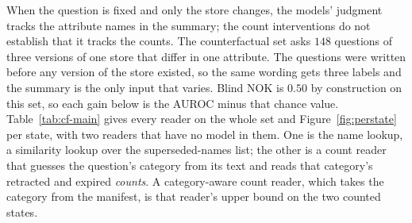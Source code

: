 \documentclass{article}
\begin{document}
When the question is fixed and only the store changes, the models' judgment tracks the attribute names in the summary; the count interventions do not establish that it tracks the counts.
The counterfactual set asks $148$ questions of three versions of one store that differ in one attribute.
The questions were written before any version of the store existed, so the same wording gets three labels and the summary is the only input that varies.
Blind NOK is $0.50$ by construction on this set, so each gain below is the AUROC minus that chance value.
Table~\ref{tab:cf-main} gives every reader on the whole set and Figure~\ref{fig:perstate} per state, with two readers that have no model in them.
One is the name lookup, a similarity lookup over the superseded-names list; the other is a count reader that guesses the question's category from its text and reads that category's retracted and expired \emph{counts}.
A category-aware count reader, which takes the category from the manifest, is that reader's upper bound on the two counted states.
\end{document}
